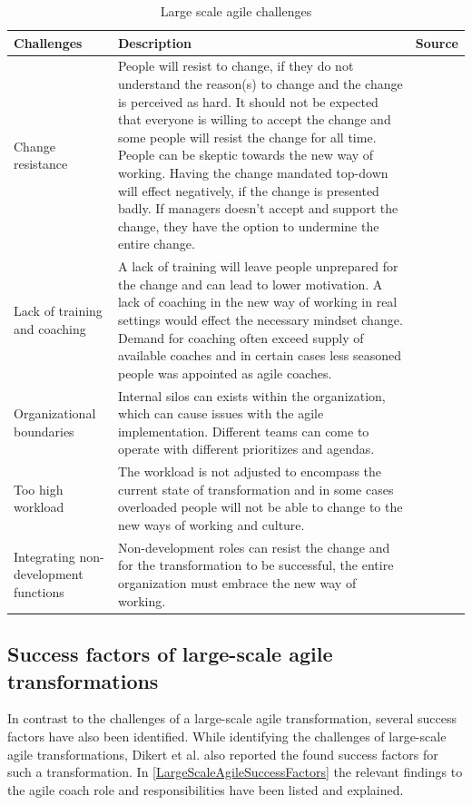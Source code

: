 \documentclass[11pt,a4paper]{report}
\begin{document}
\clearpage
\begin{table}[!ht]
\begin{tabular}{|p{5cm}|p{8cm}|p{1cm}|}
\hline
\textbf{Challenges} & \textbf{Description} & \textbf{Source} \\ \hline
Change resistance   & People will resist to change, if they do not understand the reason(s) to change and the change is perceived as hard. It should not be expected that everyone is willing to accept the change and some people will resist the change for all time. People can be skeptic towards the new way of working. Having the change mandated top-down will effect negatively, if the change is presented badly. If managers doesn't accept and support the change, they have the option to undermine the entire change.   &    \cite{dikert2016challenges}     \\\hline
Lack of training and coaching & A lack of training will leave people unprepared for the change and can lead to lower motivation. A lack of coaching in the new way of working in real settings would effect the necessary mindset change. Demand for coaching often exceed supply of available coaches and in certain cases less seasoned people was appointed as agile coaches.   &    \cite{dikert2016challenges}     \\\hline
Organizational boundaries & Internal silos can exists within the organization, which can cause issues with the agile implementation. Different teams can come to operate with different prioritizes and agendas.   & \cite{dikert2016challenges} \\ \hline
Too high workload & The workload is not adjusted to encompass the current state of transformation and in some cases overloaded people will not be able to change to the new ways of working and culture.  &    \cite{dikert2016challenges}     \\\hline
Integrating non-development functions   & Non-development roles can resist the change and for the transformation to be successful, the entire organization must embrace the new way of working. &    \cite{dikert2016challenges}     \\\hline
\end{tabular}
\caption{Large scale agile challenges}
\label{LargeScaleAgileChallenges}
\end{table}

\clearpage

\subsection{Success factors of large-scale agile transformations}
In contrast to the challenges of a large-scale agile transformation, several success factors have also been identified. While identifying the challenges of large-scale agile transformations, Dikert et al. \cite{dikert2016challenges} also reported the found success factors for such a transformation. In \autoref{LargeScaleAgileSuccessFactors} the relevant findings to the agile coach role and responsibilities have been listed and explained.
\end{document}
